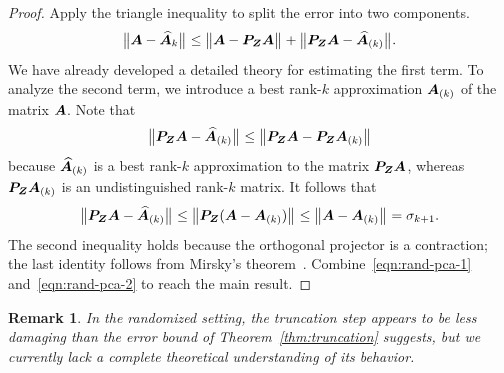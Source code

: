 \documentclass[final]{siamltex}
\newtheorem{remark}{Remark}[section]
\begin{document}

\begin{proof}
Apply the triangle inequality to split the error into two components.
\begin{equation} \label{eqn:rand-pca-1}
\smnorm{}{ \mtx{A} - \widehat{\mtx{A}}_k }
	\leq \smnorm{}{ \mtx{A} - \mtx{P}_{\mtx{Z}} \mtx{A} }
	+ \smnorm{}{ \mtx{P}_{\mtx{Z}} \mtx{A} - \widehat{\mtx{A}}_{(k)} }.
\end{equation}
We have already developed a detailed theory for estimating the first term.  To analyze the second term, we introduce a best rank-$k$ approximation $\bm{A}_{(k)}$ of the matrix $\bm{A}$.  Note that
$$
{\bigl\Vert { \bm{P}_{\bm{Z}} \bm{A} - \widehat{\bm{A}}_{(k)} } \bigr\Vert}_{}
	\leq {\bigl\Vert { \bm{P}_{\bm{Z}} \bm{A} - \bm{P}_{\bm{Z}} \bm{A}_{(k)} } \bigr\Vert}_{}
$$
because $\widehat{\bm{A}}_{(k)}$ is a best rank-$k$ approximation to the matrix $\bm{P}_{\bm{Z}} \bm{A}$, whereas $\bm{P}_{\bm{Z}} \bm{A}_{(k)}$ is an undistinguished rank-$k$ matrix.  It follows that
\begin{equation} \label{eqn:rand-pca-2}
\smnorm{}{ \mtx{P}_{\mtx{Z}} \mtx{A} - \widehat{\mtx{A}}_{(k)} }
	\leq \smnorm{}{ \mtx{P}_{\mtx{Z}} (\mtx{A} - \mtx{A}_{(k)}) }
	\leq \smnorm{}{ \mtx{A} - \mtx{A}_{(k)} }
	= \sigma_{k+1}.
\end{equation}
The second inequality holds because the orthogonal projector is a contraction; the last identity follows from Mirsky's theorem~\cite{Mir60:Symmetric-Gauge}.  Combine~\eqref{eqn:rand-pca-1} and~\eqref{eqn:rand-pca-2} to reach the main result.
\end{proof}

\lsp

\begin{remark} \rm
In the randomized setting, the truncation step appears to be less damaging than the error bound of Theorem~\ref{thm:truncation} suggests, but we currently lack a complete theoretical understanding of its behavior.
\end{remark}

\lsp
\end{document}
